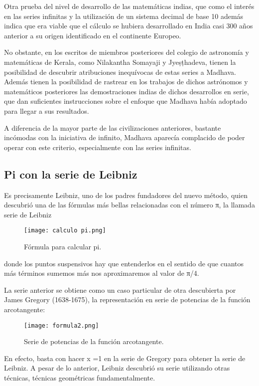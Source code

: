 \documentclass[a4paper]{article}
\begin{document}
Otra prueba del nivel de desarrollo de las matemáticas indias, que como el interés en las series infinitas y la utilización de un sistema decimal de base 10 además indica que era viable que el cálculo se hubiera desarrollado en India casi 300 años anterior a su origen identificado en el continente Europeo.  

No obstante, en los escritos de miembros posteriores del colegio de astronomía y matemáticas de Kerala, como Nilakantha Somayaji y Jyeṣṭhadeva, tienen la posibilidad de descubrir atribuciones inequívocas de estas series a Madhava. Además tienen la posibilidad de rastrear en los trabajos de dichos astrónomos y matemáticos posteriores las demostraciones indias de dichos desarrollos en serie, que dan suficientes instrucciones sobre el enfoque que Madhava había adoptado para llegar a sus resultados.  

A diferencia de la mayor parte de las civilizaciones anteriores, bastante incómodas con la iniciativa de infinito, Madhava aparecía complacido de poder operar con este criterio, especialmente con las series infinitas\cite{ff2}. 

\subsection{Pi con la serie de Leibniz}

Es precisamente Leibniz, uno de los padres fundadores del nuevo método, quien descubrió una de las fórmulas más bellas relacionadas con el número π, la llamada serie de Leibniz 

\begin{figure}[h]
\centering
\texttt{[image: calculo pi.png]}
\caption{\label{fig:biomec3}Fórmula para calcular pi.}
\end{figure}

donde los puntos suspensivos hay que entenderlos en el sentido de que cuantos más términos sumemos más nos aproximaremos al valor de π/4. 

La serie anterior se obtiene como un caso particular de otra descubierta por James Gregory (1638-1675), la representación en serie de potencias de la función arcotangente: 

\begin{figure}[h]
\centering
\texttt{[image: formula2.png]}
\caption{\label{fig:biomec1}Serie de potencias de la función arcotangente.}
\end{figure}

En efecto, basta con hacer x =1 en la serie de Gregory para obtener la serie de Leibniz. A pesar de lo anterior, Leibniz descubrió su serie utilizando otras técnicas, técnicas geométricas fundamentalmente. 
\end{document}
